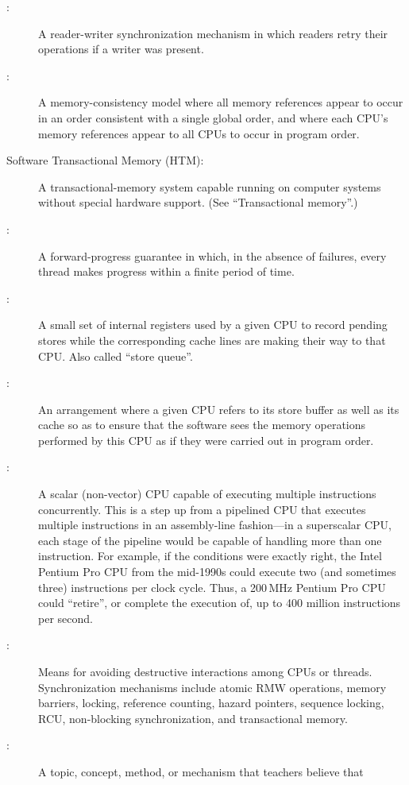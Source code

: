\begin{description}
\item[:]
	A reader-writer synchronization mechanism in which readers
	retry their operations if a writer was present.
\item[:]
	A memory-consistency model where all memory references appear to occur
	in an order consistent with
	a single global order, and where each CPU's memory references
	appear to all CPUs to occur in program order.
\item[Software Transactional Memory (HTM):]
	A transactional-memory system capable running on computer systems
	without special hardware support.
	(See ``Transactional memory''.)
\item[:]
	A forward-progress guarantee in which, in the absence of
	failures, every thread makes progress within a finite
	period of time.
\item[:]
	A small set of internal registers used by a given CPU
	to record pending stores
	while the corresponding cache lines are making their
	way to that CPU\@.
	Also called ``store queue''.
\item[:]
	An arrangement where a given CPU refers to its store buffer
	as well as its cache so as to ensure that the software sees
	the memory operations performed by this CPU as if they
	were carried out in program order.
\item[:]
	A scalar (non-vector) CPU capable of executing multiple instructions
	concurrently.
	This is a step up from a pipelined CPU that executes multiple
	instructions in an assembly-line fashion---in a superscalar
	CPU, each stage of the pipeline would be capable of handling
	more than one instruction.
	For example, if the conditions were exactly right,
	the Intel Pentium Pro CPU from the mid-1990s could
	execute two (and sometimes three) instructions per clock cycle.
	Thus, a 200\,MHz Pentium Pro CPU could ``retire'', or complete the
	execution of, up to 400 million instructions per second.
\item[:]
	Means for avoiding destructive interactions among CPUs or threads.
	Synchronization mechanisms include atomic RMW operations, memory
	barriers, locking, reference counting, hazard pointers, sequence
	locking, RCU, non-blocking synchronization, and transactional
	memory.
\item[:]
	A topic, concept, method, or mechanism that teachers believe that

\end{description}
